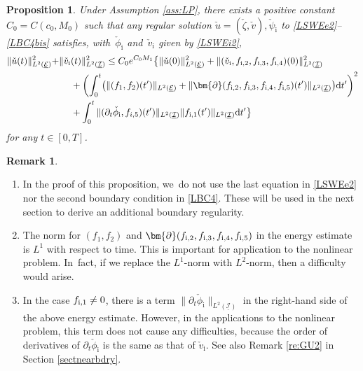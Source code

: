 \documentclass[10pt]{amsart}
\newenvironment{enumeratei}
{\bgroup\def\theenumi{\roman{enumi}}\def\theenumii{\arabic{enumii}}\begin{enumerate}}
{\end{enumerate}\egroup}
\newcommand{\dt}{\partial_t}
\newcommand{\cI}{{\mathcal I}}
\newcommand{\cE}{{\mathcal E}}
\newcommand{\ul}[1]{\underline{#1}}
\newtheorem{proposition}[theorem]{Proposition}
\theoremstyle{definition}
\newtheorem{remark}[theorem]{Remark}
\begin{document}
\begin{proposition}\label{prop:BEE}
Under Assumption \ref{ass:LP}, there exists a positive constant $C_0=C(c_0,M_0)$ such that any regular solution
$\check{u}=(\check{\zeta},\check{v}), \check{\psi}_\mathrm{i}$ to \eqref{LSWEe2}--\eqref{LBC4bis} satisfies,
with~$\check{\phi}_\mathrm{i}$ and~$\check{v}_\mathrm{i}$ given by \eqref{LSWEi2},
\begin{align*}
\|\check{u}(t)\|_{L^2(\ul{\cE})}^2 +& \|\check{v}_\mathrm{i}(t)\|_{L^2(\ul{\cI})}^2
\leq C_0 e^{C_0M_1}\bigl\{ \|\check{u}(0)\|_{L^2(\ul{\cE})}^2 + \|(\check{v}_\mathrm{i},f_{{\rm i},2},f_{{\rm i},3},f_{{\rm i},4})(0)\|_{L^2(\ul{\cI})}^2 \\
&\quad\;
+ \left(\int_0^t \bigl(\|(f_1,f_2)(t')\|_{L^2(\ul{\cE})}
+ \|\bm{\partial}(f_{{\rm i},2},f_{{\rm i},3},f_{{\rm i},4},f_{{\rm i},5})(t')\|_{L^2(\ul{\cI})} \bigr){\rm d}t' \right)^2\\
&\quad\;
+ \int_0^t\|(\dt\check{\phi}_\mathrm{i},f_{i,5})(t')\|_{L^2(\ul{\cI})}\|f_{{\rm i},1}(t')\|_{L^2(\ul{\cI})}{\rm d}t' \bigr\}
\end{align*}
for any $t\in[0,T]$.
\end{proposition}

\skpt
\begin{remark}
\begin{enumeratei}
\item
In the proof of this proposition, we~do not use the last equation in \eqref{LSWEe2} nor the second boundary condition in \eqref{LBC4}.
These will be used in the next section to derive an additional boundary regularity.

\item
The norm for $(f_1,f_2)$ and $\bm{\partial}(f_{{\rm i},2},f_{{\rm i},3},f_{{\rm i},4},f_{{\rm i},5})$ in the energy estimate is $L^1$ with respect to time.
This is important for application to the nonlinear problem. In~fact, if we replace the $L^1$-norm with $L^2$-norm, then a difficulty would arise.

\item
In the case $f_{{\rm i},1}\ne0$, there is a term $\|\dt\check{\phi}_\mathrm{i}\|_{L^2(\ul{\cI})}$ in the right-hand side of the above energy estimate.
However, in the applications to the nonlinear problem, this term does not cause any difficulties,
because the order of derivatives of $\dt\check{\phi}_\mathrm{i}$ is the same as that of $\check{v}_\mathrm{i}$.
See also Remark \ref{re:GU2} in Section \ref{sectnearbdry}.
\end{enumeratei}
\end{remark}
\end{document}
